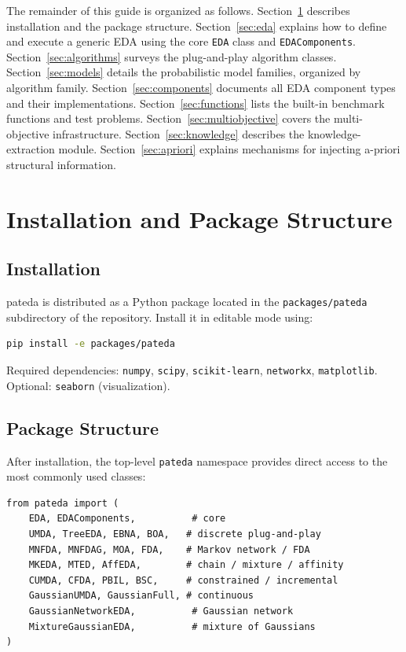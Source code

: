 \documentclass[a4paper,11pt]{article}
\begin{document}
The remainder of this guide is organized as follows.
Section~\ref{sec:install} describes installation and the package structure.
Section~\ref{sec:eda} explains how to define and execute a generic EDA using
the core \texttt{EDA} class and \texttt{EDAComponents}.
Section~\ref{sec:algorithms} surveys the plug-and-play algorithm classes.
Section~\ref{sec:models} details the probabilistic model families, organized
by algorithm family.
Section~\ref{sec:components} documents all EDA component types and their
implementations.
Section~\ref{sec:functions} lists the built-in benchmark functions and test problems.
Section~\ref{sec:multiobjective} covers the multi-objective infrastructure.
Section~\ref{sec:knowledge} describes the knowledge-extraction module.
Section~\ref{sec:apriori} explains mechanisms for injecting a-priori structural
information.

\section{Installation and Package Structure}
\label{sec:install}

\subsection{Installation}

pateda is distributed as a Python package located in the \texttt{packages/pateda}
subdirectory of the repository.  Install it in editable mode using:

\begin{lstlisting}[language=bash]
pip install -e packages/pateda
\end{lstlisting}

\noindent Required dependencies: \texttt{numpy}, \texttt{scipy},
\texttt{scikit-learn}, \texttt{networkx}, \texttt{matplotlib}.
Optional: \texttt{seaborn} (visualization).

\subsection{Package Structure}

After installation, the top-level \texttt{pateda} namespace provides direct
access to the most commonly used classes:

\begin{lstlisting}
from pateda import (
    EDA, EDAComponents,          # core
    UMDA, TreeEDA, EBNA, BOA,   # discrete plug-and-play
    MNFDA, MNFDAG, MOA, FDA,    # Markov network / FDA
    MKEDA, MTED, AffEDA,        # chain / mixture / affinity
    CUMDA, CFDA, PBIL, BSC,     # constrained / incremental
    GaussianUMDA, GaussianFull, # continuous
    GaussianNetworkEDA,          # Gaussian network
    MixtureGaussianEDA,          # mixture of Gaussians
)
\end{lstlisting}
\end{document}
